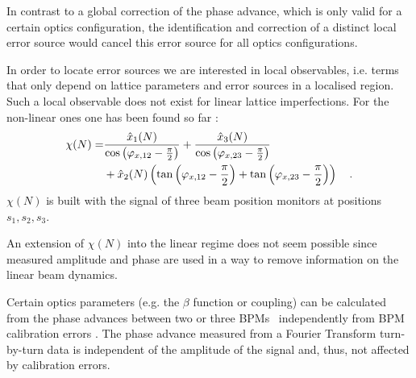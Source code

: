 In contrast to a global correction of the phase advance, which is only valid for a certain optics configuration,
the identification and correction of a distinct local error source would cancel this error source for all optics
configurations.


In order to locate error sources we are interested in local
observables, i.e. terms that only depend on lattice parameters and error sources in a localised
region. Such a local observable does not exist for linear lattice imperfections. For the non-linear
ones one has been found so far
\cite{Tomas2005, Franchi2007}: 
%
\begin{align}
  \chi(N) =& \frac{\hat{x}_1(N)}{\cos \left( \varphi_{x,12} - \frac{\pi}{2} \right)} 
  + \frac{\hat{x}_3(N)}{\cos\left( \varphi_{x,23}-\frac{\pi}{2} \right)} \notag \\
  &+ \hat{x}_2 (N) \left(
    \tan\left( \varphi_{x,12}-\frac{\pi}{2} \right)
    + \tan\left( \varphi_{x,23}-\frac{\pi}{2} \right)
  \right)
  \quad .
  \label{eq_chi}
\end{align}
%
$\chi (N)$ is built with the signal of three beam position monitors at positions $s_1, s_2, s_3$.

An extension of $\chi(N)$ into the linear regime does not seem possible since measured amplitude
and phase are used in a way to remove information on the linear beam dynamics.

Certain optics parameters (e.g. the $\beta$ function or coupling) can be calculated from the phase
advances between two or three BPMs~\cite{Franchi2010, Miyamoto2010, Castro1996}
independently from BPM calibration errors \cite{Calaga2007}. 
The phase advance measured from a Fourier Transform \cite{Guo2016} turn-by-turn data is independent of the amplitude
of the signal and, thus, not affected by calibration errors.


